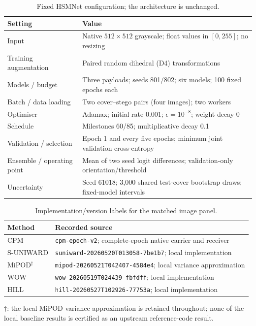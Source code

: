 \documentclass[journal]{IEEEtran}
\renewcommand{\arraystretch}{1.2}
\renewcommand{\arraystretch}{1.0}
\theoremstyle{definition}
\theoremstyle{game}
\renewcommand{\arraystretch}{1.5}
\begin{document}
\begin{table}[!t]
\centering\footnotesize
\caption{Fixed HSMNet configuration; the architecture is unchanged.}
\label{tab:hsm-config}
\setlength{\tabcolsep}{4pt}\renewcommand{\arraystretch}{1.15}
\begin{tabular}{lp{}}
\toprule
Setting & Value\\
\midrule
Input & Native $512\times512$ grayscale; float values in $[0,255]$; no resizing\\
Training augmentation & Paired random dihedral (D4) transformations\\
Models / budget & Three payloads; seeds 801/802; six models; 100 fixed epochs each\\
Batch / data loading & Two cover--stego pairs (four images); two workers\\
Optimiser & Adamax; initial rate 0.001; $\epsilon=10^{-8}$; weight decay 0\\
Schedule & Milestones 60/85; multiplicative decay 0.1\\
Validation / selection & Epoch 1 and every five epochs; minimum joint validation cross-entropy\\
Ensemble / operating point & Mean of two seed logit differences; validation-only orientation/threshold\\
Uncertainty & Seed 61018; 3,000 shared test-cover bootstrap draws; fixed-model intervals\\
\bottomrule
\end{tabular}

\end{table}

\begin{table}[!t]
\centering\footnotesize
\caption{Implementation/version labels for the matched image panel.}
\label{tab:hsm-versions}
\setlength{\tabcolsep}{4pt}\renewcommand{\arraystretch}{1.15}
\begin{tabular}{lp{}}
\toprule
Method & Recorded source\\
\midrule
CPM & \texttt{cpm-epoch-v2}; complete-epoch native carrier and receiver\\
S-UNIWARD & \texttt{suniward-20260520T013058-7be1b7}; local implementation\\
MiPOD$^\dagger$ & \texttt{mipod-20260521T042407-4584e4}; local variance approximation\\
WOW & \texttt{wow-20260519T024439-fbfdff}; local implementation\\
HILL & \texttt{hill-20260527T102926-77753a}; local implementation\\
\bottomrule
\end{tabular}
\par\smallskip\parbox{.97\textwidth}{\footnotesize $\dagger$: the local MiPOD variance approximation is retained throughout; none of the local baseline results is certified as an upstream reference-code result.}
\end{table}
\end{document}
